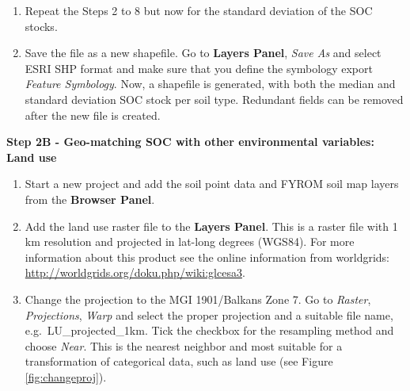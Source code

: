\documentclass[10pt,b5paper,]{book}
\providecommand{\tightlist}{%
  \setlength{\itemsep}{0pt}\setlength{\parskip}{0pt}}
\theoremstyle{definition}
\theoremstyle{definition}
\theoremstyle{definition}
\theoremstyle{remark}
\begin{document}
\begin{enumerate}
\def\labelenumi{\arabic{enumi}.}
\setcounter{enumi}{9}
\tightlist
\item
  Repeat the Steps 2 to 8 but now for the standard deviation of the SOC
  stocks.
\item
  Save the file as a new shapefile. Go to \textbf{Layers Panel},
  \emph{Save As} and select ESRI SHP format and make sure that you
  define the symbology export \emph{Feature Symbology}. Now, a shapefile
  is generated, with both the median and standard deviation SOC stock
  per soil type. Redundant fields can be removed after the new file is
  created.
\end{enumerate}

\textbf{Step 2B - Geo-matching SOC with other environmental variables:
Land use}

\begin{enumerate}
\def\labelenumi{\arabic{enumi}.}
\tightlist
\item
  Start a new project and add the soil point data and FYROM soil map
  layers from the \textbf{Browser Panel}.
\item
  Add the land use raster file to the \textbf{Layers Panel}. This is a
  raster file with 1 km resolution and projected in lat-long degrees
  (WGS84). For more information about this product see the online
  information from worldgrids:
  \url{http://worldgrids.org/doku.php/wiki:glcesa3}.
\item
  Change the projection to the MGI 1901/Balkans Zone 7. Go to
  \emph{Raster}, \emph{Projections}, \emph{Warp} and select the proper
  projection and a suitable file name, e.g.~LU\_projected\_1km. Tick the
  checkbox for the resampling method and choose \emph{Near}. This is the
  nearest neighbor and most suitable for a transformation of categorical
  data, such as land use (see Figure \ref{fig:changeproj}).
\end{enumerate}
\end{document}
